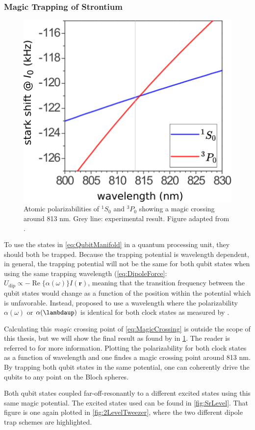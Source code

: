 \subsubsection*{Magic Trapping of Strontium}\label{sec:Magic}

\begin{figure}
    \centering
    \includegraphics[width=0.38\linewidth]{figures/Magic.pdf}
    \caption{Atomic polarizabilities of ${}^1S_0$ and ${}^3P_0$ showing a magic crossing around 813 nm. Grey line: experimental result. Figure adapted from \cite{Boyd2007}.} 
    \label{fig:BoydMagic}
\end{figure}

To use the states in \cref{eq:QubitManifold} in a quantum processing unit, they should both be trapped. Because the trapping potential is wavelength dependent, in general, the trapping potential will not be the same for both qubit states when using the same trapping wavelength (\cref{eq:DipoleForce}: $U_{\text{dip}} \propto - \operatorname{Re}\{\alpha(\omega)\} I(\mathbf{r})$, meaning that the transition frequency between the qubit states would change as a function of the position within the potential which is unfavorable. Instead, \cite{Katori2003} proposed to use a wavelength where the polarizability $\alpha(\omega)$ or $\alpha(\lambdaup)$ is identical for both clock states as measured by \cite{Takamoto2005,Jun2008}.

Calculating this \textit{magic} crossing point of \cref{eq:MagicCrossing} is outside the scope of this thesis, but we will show the final result as found by \cite{Boyd2007} in \cref{fig:BoydMagic}. The reader is referred to \cite{Madjarov2020,Boyd2007} for more information. Plotting the polarizability for both clock states as a function of wavelength and one findes a magic crossing point around 813 nm. By trapping both qubit states in the same potential, one can coherently drive the qubits to any point on the Bloch spheres. 

Both qubit states coupled far-off-resonantly to a different excited states using this same magic potential. The excited states used can be found in \cref{fig:SrLevel}. That figure is one again plotted in \cref{fig:2LevelTweezer}, where the two different dipole trap schemes are highlighted.

